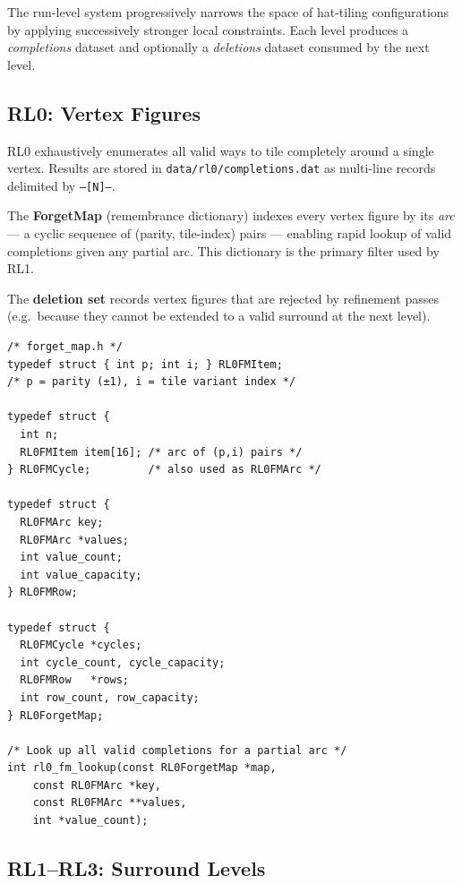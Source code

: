 \documentclass[10pt,a4paper]{article}
\let\polysubsection\subsection
\renewcommand\subsection{\needspace{0.12\textheight}\polysubsection}
\newcommand{\code}[1]{\texttt{\small #1}}
\newcommand{\file}[1]{\texttt{\footnotesize #1}}
\begin{document}
The run-level system progressively narrows the space of hat-tiling
configurations by applying successively stronger local constraints.
Each level produces a \emph{completions} dataset and optionally a
\emph{deletions} dataset consumed by the next level.

\subsection{RL0: Vertex Figures}

\begin{tcolorbox}[dualbox, title=RL0 — Vertex Figure Generation — \file{src/rl0/}]
  RL0 exhaustively enumerates all valid ways to tile completely around
  a single vertex.  Results are stored in \file{data/rl0/completions.dat}
  as multi-line records delimited by \code{---[N]---}.

  The \textbf{ForgetMap} (remembrance dictionary) indexes every
  vertex figure by its \emph{arc} — a cyclic sequence of
  (parity, tile-index) pairs — enabling rapid lookup of valid
  completions given any partial arc.  This dictionary is the primary
  filter used by RL1.

  The \textbf{deletion set} records vertex figures that are rejected
  by refinement passes (e.g.\ because they cannot be extended to a
  valid surround at the next level).
\tcblower
\begin{verbatim}
/* forget_map.h */
typedef struct { int p; int i; } RL0FMItem;
/* p = parity (±1), i = tile variant index */

typedef struct {
  int n;
  RL0FMItem item[16]; /* arc of (p,i) pairs */
} RL0FMCycle;         /* also used as RL0FMArc */

typedef struct {
  RL0FMArc key;
  RL0FMArc *values;
  int value_count;
  int value_capacity;
} RL0FMRow;

typedef struct {
  RL0FMCycle *cycles;
  int cycle_count, cycle_capacity;
  RL0FMRow   *rows;
  int row_count, row_capacity;
} RL0ForgetMap;

/* Look up all valid completions for a partial arc */
int rl0_fm_lookup(const RL0ForgetMap *map,
    const RL0FMArc *key,
    const RL0FMArc **values,
    int *value_count);
\end{verbatim}
\end{tcolorbox}

\subsection{RL1–RL3: Surround Levels}
\end{document}
